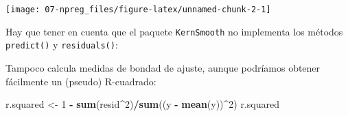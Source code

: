 \documentclass[]{book}
\newenvironment{Shaded}{\begin{snugshade}}{\end{snugshade}}
\newcommand{\KeywordTok}[1]{\textcolor[rgb]{0.13,0.29,0.53}{\textbf{#1}}}
\newcommand{\DataTypeTok}[1]{\textcolor[rgb]{0.13,0.29,0.53}{#1}}
\newcommand{\DecValTok}[1]{\textcolor[rgb]{0.00,0.00,0.81}{#1}}
\newcommand{\StringTok}[1]{\textcolor[rgb]{0.31,0.60,0.02}{#1}}
\newcommand{\CommentTok}[1]{\textcolor[rgb]{0.56,0.35,0.01}{\textit{#1}}}
\newcommand{\OperatorTok}[1]{\textcolor[rgb]{0.81,0.36,0.00}{\textbf{#1}}}
\newcommand{\NormalTok}[1]{#1}
\theoremstyle{break}
\theoremstyle{definition}
\theoremstyle{definition}
\theoremstyle{definition}
\theoremstyle{remark}
\begin{document}
\begin{Shaded}
\end{Shaded}

\begin{center}\texttt{[image: 07-npreg\_files/figure-latex/unnamed-chunk-2-1]} \end{center}

Hay que tener en cuenta que el paquete \texttt{KernSmooth} no implementa
los métodos \texttt{predict()} y \texttt{residuals()}:

\begin{Shaded}
\end{Shaded}

Tampoco calcula medidas de bondad de ajuste, aunque podríamos obtener
fácilmente un (pseudo) R-cuadrado:

\begin{Shaded}
\begin{Highlighting}[]
\NormalTok{r.squared <-}\StringTok{ }\DecValTok{1} \OperatorTok{-}\StringTok{ }\KeywordTok{sum}\NormalTok{(resid}\OperatorTok{^}\DecValTok{2}\NormalTok{)}\OperatorTok{/}\KeywordTok{sum}\NormalTok{((y }\OperatorTok{-}\StringTok{ }\KeywordTok{mean}\NormalTok{(y))}\OperatorTok{^}\DecValTok{2}\NormalTok{)}
\NormalTok{r.squared}
\end{Highlighting}
\end{Shaded}
\end{document}
